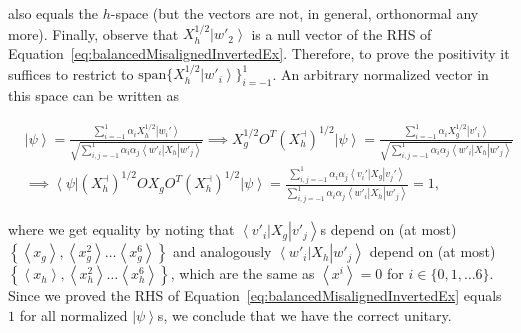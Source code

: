 \documentclass{theoretics}
\begin{document}
also equals the $h$-space (but the vectors are not, in general, orthonormal
any more). Finally, observe that $X_{h}^{1/2}\left|w'_{2}\right\rangle $
is a null vector of the RHS of Equation~\eqref{eq:balancedMisalignedInvertedEx}.
Therefore, to prove the positivity it suffices to restrict
to $\text{span}\{X_{h}^{1/2}\left|w'_{i}\right\rangle \}_{i=-1}^{1}$.
An arbitrary normalized vector in this space can be written as
\begin{footnotesize}
  \begin{align*}
     & \left|\psi\right\rangle   =\frac{\sum_{i=-1}^{1}\alpha_{i}X_{h}^{1/2}\left|w_{i}'\right\rangle }{\sqrt{\sum_{i,j=-1}^{1}\alpha_{i}\alpha_{j}\left\langle w'_{i}\right|X_{h}\left|w'_{j}\right\rangle }}
    \implies X_{g}^{1/2}O^{T}(X_{h}^{\dashv})^{1/2}\left|\psi\right\rangle  =\frac{\sum_{i=-1}^{1}\alpha_{i}X_{g}^{1/2}\left|v'_{i}\right\rangle }{\sqrt{\sum_{i,j=-1}^{1}\alpha_{i}\alpha_{j}\left\langle w'_{i}\right|X_{h}\left|w'_{j}\right\rangle }}                                                                         \\
     & \implies\left\langle \psi\right|(X_{h}^{\dashv})^{1/2}OX_{g}O^{T}(X_{h}^{\dashv})^{1/2}\left|\psi\right\rangle   =\frac{\sum_{i,j=-1}^{1}\alpha_{i}\alpha_{j}\left\langle v_{i}'\right|X_{g}\left|v_{j}'\right\rangle }{\sum_{i,j=-1}^{1}\alpha_{i}\alpha_{j}\left\langle w'_{i}\right|X_{h}\left|w'_{j}\right\rangle }=1,
  \end{align*}
\end{footnotesize}
where we get equality by noting that $\left\langle v'_{i}\right|X_{g}\left|v'_{j}\right\rangle $s
depend on (at most) $\left\{ \left\langle x_{g}\right\rangle ,\left\langle x_{g}^{2}\right\rangle \dots\left\langle x_{g}^{6}\right\rangle \right\} $
and analogously $\left\langle w'_{i}\right|X_{h}\left|w'_{j}\right\rangle $
depend on (at most) $\left\{ \left\langle x_{h}\right\rangle ,\left\langle x_{h}^{2}\right\rangle \dots\left\langle x_{h}^{6}\right\rangle \right\} $,
which are the same as $\left\langle x^{i}\right\rangle =0$
for $i\in\{0,1,\dots6\}$. Since we proved the RHS of Equation~\eqref{eq:balancedMisalignedInvertedEx}
equals $1$ for all normalized $\left|\psi\right\rangle $s, we conclude that
we have the correct unitary.
\end{document}
